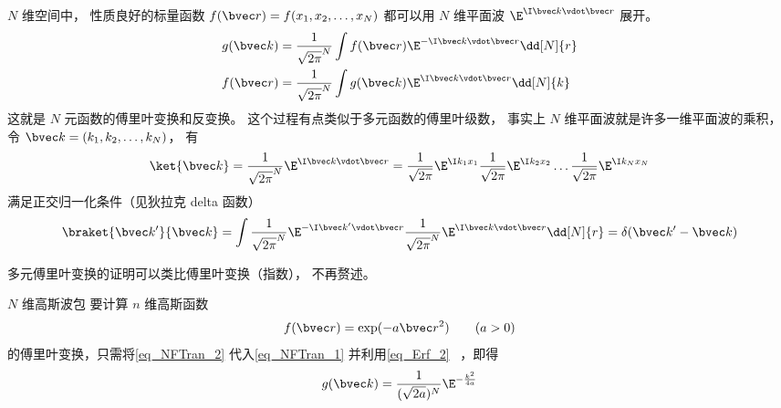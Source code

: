 

$N$ 维空间中， 性质良好的标量函数 $f(\bvec r) = f(x_1, x_2, \dots, x_N)$ 都可以用 $N$ 维平面波 $\E^{\I \bvec k\vdot \bvec r}$ 展开。
\begin{align}
g(\bvec k) &= \frac{1}{\sqrt{2\pi}^N} \int f(\bvec r) \E^{-\I \bvec k \vdot \bvec r} \dd[N]{r}\label{eq_NFTran_1}\\
f(\bvec r) &= \frac{1}{\sqrt{2\pi}^N} \int g(\bvec k) \E^{\I \bvec k \vdot \bvec r} \dd[N]{k}
\end{align}
这就是 $N$ 元函数的傅里叶变换和反变换。 这个过程有点类似于多元函数的傅里叶级数， 事实上 $N$ 维平面波就是许多一维平面波的乘积， 令 $\bvec k = (k_1, k_2, \dots, k_N)$， 有
\begin{equation}
\ket{\bvec k} = \frac{1}{\sqrt{2\pi}^N}\E^{\I \bvec k \vdot \bvec r} = \frac{1}{\sqrt{2\pi}} \E^{\I k_1 x_1} \frac{1}{\sqrt{2\pi}} \E^{\I k_2 x_2} \dots \frac{1}{\sqrt{2\pi}} \E^{\I k_N x_N}
\end{equation}
满足正交归一化条件（见狄拉克 delta 函数）
\begin{equation}
\braket{\bvec k'}{\bvec k} = \int \frac{1}{\sqrt{2\pi}^N}\E^{-\I \bvec k' \vdot \bvec r} \frac{1}{\sqrt{2\pi}^N}\E^{\I \bvec k \vdot \bvec r} \dd[N]{r} = \delta(\bvec k'- \bvec k)
\end{equation}

多元傅里叶变换的证明可以类比傅里叶变换（指数）， 不再赘述。

\begin{example}{$N$ 维高斯波包}
要计算 $n$ 维高斯函数
\begin{equation}\label{eq_NFTran_2}
f(\bvec r) = \exp(-a\bvec r^2) \qquad (a > 0)
\end{equation}
的傅里叶变换，只需将\autoref{eq_NFTran_2} 代入\autoref{eq_NFTran_1} 并利用\autoref{eq_Erf_2}~ ，即得
\begin{equation}
g(\bvec k) = \frac{1}{(\sqrt{2a})^N}\E^{-\frac{k^2}{4a}}
\end{equation}
\end{example}
